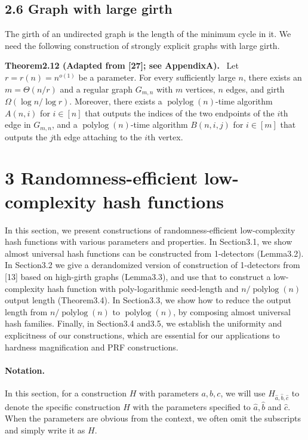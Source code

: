 \documentclass[10pt,a4paper]{article}
\newenvironment{authorclaim}[1]{\par\medskip\noindent\textbf{#1.}\ }{\par\medskip}
\begin{document}
\subsection*{2.6 Graph with large girth}
The girth of an undirected graph is the length of the minimum cycle in it. We need the following construction of strongly explicit graphs with large girth.
\begin{authorclaim}{Theorem2.12 (Adapted from [27]; see AppendixA)}
Let $r=r(n)=n^{o(1)}$ be a parameter. For every sufficiently large $n$, there exists an $m=\Theta(n/r)$ and a regular graph $G_{m,n}$ with $m$ vertices, $n$ edges, and girth $\Omega(\log n/\log r)$. Moreover, there exists a $\operatorname{polylog}(n)$-time algorithm $A(n,i)$ for $i\in[n]$ that outputs the indices of the two endpoints of the $i$th edge in $G_{m,n}$, and a $\operatorname{polylog}(n)$-time algorithm $B(n,i,j)$ for $i\in[m]$ that outputs the $j$th edge attaching to the $i$th vertex.
\end{authorclaim}

\section*{3 Randomness-efficient low-complexity hash functions}
In this section, we present constructions of randomness-efficient low-complexity hash functions with various parameters and properties.
In Section3.1, we show almost universal hash functions can be constructed from 1-detectors (Lemma3.2). In Section3.2 we give a derandomized version of construction of 1-detectors from [13] based on high-girth graphs (Lemma3.3), and use that to construct a low-complexity hash function with poly-logarithmic seed-length and $n/\operatorname{polylog}(n)$ output length (Theorem3.4).
In Section3.3, we show how to reduce the output length from $n/\operatorname{polylog}(n)$ to $\operatorname{polylog}(n)$, by composing almost universal hash families. Finally, in Section3.4 and3.5, we establish the uniformity and explicitness of our constructions, which are essential for our applications to hardness magnification and PRF constructions.
\paragraph{Notation.} In this section, for a construction $H$ with parameters $a,b,c$, we will use $H_{\hat a,\hat b,\hat c}$ to denote the specific construction $H$ with the parameters specified to $\hat a,\hat b$ and $\hat c$. When the parameters are obvious from the context, we often omit the subscripts and simply write it as $H$.
\end{document}
